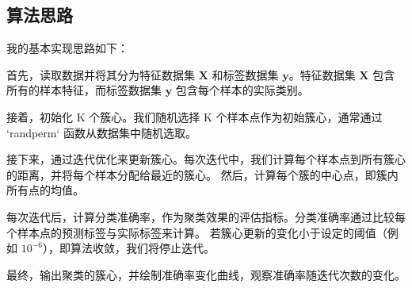 \documentclass[12pt,a4paper,oneside]{article}
\begin{document}
\subsection{算法思路}

我的基本实现思路如下：

首先，读取数据并将其分为特征数据集 $\mathbf{X}$ 和标签数据集 $\mathbf{y}$。特征数据集 $\mathbf{X}$ 包含所有的样本特征，而标签数据集 $\mathbf{y}$ 包含每个样本的实际类别。

接着，初始化 K 个簇心。我们随机选择 K 个样本点作为初始簇心，通常通过 `randperm` 函数从数据集中随机选取。

接下来，通过迭代优化来更新簇心。每次迭代中，我们计算每个样本点到所有簇心的距离，并将每个样本分配给最近的簇心。
然后，计算每个簇的中心点，即簇内所有点的均值。

每次迭代后，计算分类准确率，作为聚类效果的评估指标。分类准确率通过比较每个样本点的预测标签与实际标签来计算。
若簇心更新的变化小于设定的阈值（例如 $10^{-6}$），即算法收敛，我们将停止迭代。

最终，输出聚类的簇心，并绘制准确率变化曲线，观察准确率随迭代次数的变化。
\end{document}
